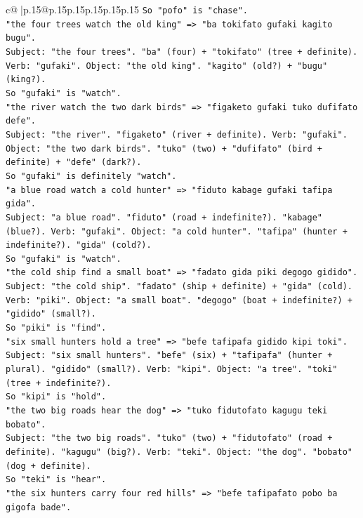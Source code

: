 \documentclass{article}
\begin{document}
{\begin{supertabular}{c@{$\;$}|p{.15\linewidth}@{}p{.15\linewidth}p{.15\linewidth}p{.15\linewidth}p{.15\linewidth}p{.15\linewidth}}
{{{\texttt{So "pofo" is "chase".} \\
\texttt{"the four trees watch the old king" => "ba tokifato gufaki kagito bugu".} \\
\texttt{Subject: "the four trees". "ba" (four) + "tokifato" (tree + definite). Verb: "gufaki". Object: "the old king". "kagito" (old?) + "bugu" (king?).} \\
\texttt{So "gufaki" is "watch".} \\
\texttt{"the river watch the two dark birds" => "figaketo gufaki tuko dufifato defe".} \\
\texttt{Subject: "the river". "figaketo" (river + definite). Verb: "gufaki". Object: "the two dark birds". "tuko" (two) + "dufifato" (bird + definite) + "defe" (dark?).} \\
\texttt{So "gufaki" is definitely "watch".} \\
\texttt{"a blue road watch a cold hunter" => "fiduto kabage gufaki tafipa gida".} \\
\texttt{Subject: "a blue road". "fiduto" (road + indefinite?). "kabage" (blue?). Verb: "gufaki". Object: "a cold hunter". "tafipa" (hunter + indefinite?). "gida" (cold?).} \\
\texttt{So "gufaki" is "watch".} \\
\texttt{"the cold ship find a small boat" => "fadato gida piki degogo gidido".} \\
\texttt{Subject: "the cold ship". "fadato" (ship + definite) + "gida" (cold). Verb: "piki". Object: "a small boat". "degogo" (boat + indefinite?) + "gidido" (small?).} \\
\texttt{So "piki" is "find".} \\
\texttt{"six small hunters hold a tree" => "befe tafipafa gidido kipi toki".} \\
\texttt{Subject: "six small hunters". "befe" (six) + "tafipafa" (hunter + plural). "gidido" (small?). Verb: "kipi". Object: "a tree". "toki" (tree + indefinite?).} \\
\texttt{So "kipi" is "hold".} \\
\texttt{"the two big roads hear the dog" => "tuko fidutofato kagugu teki bobato".} \\
\texttt{Subject: "the two big roads". "tuko" (two) + "fidutofato" (road + definite). "kagugu" (big?). Verb: "teki". Object: "the dog". "bobato" (dog + definite).} \\
\texttt{So "teki" is "hear".} \\
\texttt{"the six hunters carry four red hills" => "befe tafipafato pobo ba gigofa bade".} \\
}}}
\end{supertabular}}
\end{document}
